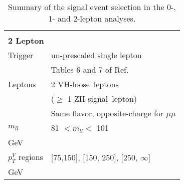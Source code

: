 \begin{table}[ht]
\begin{center}
\begin{tabular}{l l}
  &\\
\multicolumn{2}{l}{\textbf{2 Lepton}}\\
Trigger &  un-prescaled single lepton\\
        & Tables 6 and 7 of Ref.~\cite{VHobjectsupportnote}\\
Leptons & 2 VH-loose\ leptons \\
        & ($\ge$ 1 ZH-signal\ lepton) \\
        &  Same flavor, opposite-charge for $\mu\mu$ \\
$m_{ll}$   & 81 $< m_{ll} <$ 101~\\GeV \\
$p_T^{V}$ regions & [75,150], [150, 250], [250, $\infty$]~\\GeV  \\
\bottomrule

\end{tabular}
\caption{Summary of the signal event selection in the 0-, 1- and 2-lepton analyses.}
\label{tab:event-selection}
\end{center}
\end{table}